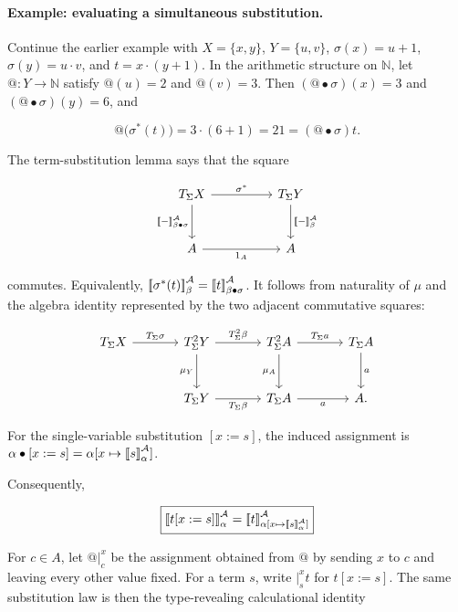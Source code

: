 \documentclass[11pt]{article}
\makeatletter
\newcommand{\llbracket}{\mathopen{[\mkern-3mu[}}
\newcommand{\rrbracket}{\mathclose{]\mkern-3mu]}}
\newcommand{\atsign}{\mathord{@}}
\makeatother
\begin{document}
\paragraph{Example: evaluating a simultaneous substitution.}
Continue the earlier example with \(X=\{x,y\}\), \(Y=\{u,v\}\),
\(\sigma(x)=u+1\), \(\sigma(y)=u\cdot v\), and
\(t=x\cdot(y+1)\). In the arithmetic structure on \(\mathbb N\), let
\(\atsign:Y\to\mathbb N\) satisfy \(\atsign(u)=2\) and \(\atsign(v)=3\).
Then \((\atsign\bullet\sigma)(x)=3\) and
\((\atsign\bullet\sigma)(y)=6\), and

\[
\atsign\bigl(\sigma^*(t)\bigr)
=3\cdot(6+1)=21
= (\atsign\bullet\sigma)t.
\]

The term-substitution lemma says
that the square

\[
\begin{tikzcd}[row sep=large,column sep=huge]
T_\Sigma X
  \arrow[r,"\sigma^*"]
  \arrow[d,"\llbracket-\rrbracket^{\mathcal A}_{\beta\bullet\sigma}"'] &
T_\Sigma Y
  \arrow[d,"\llbracket-\rrbracket^{\mathcal A}_{\beta}"] \\
A \arrow[r,"1_A"'] & A
\end{tikzcd}
\]

commutes. Equivalently,
\(\llbracket\sigma^*(t)\rrbracket^{\mathcal A}_\beta=
\llbracket t\rrbracket^{\mathcal A}_{\beta\bullet\sigma}\).
It follows from naturality of \(\mu\) and the algebra identity represented by
the two adjacent commutative squares:

\[
\begin{tikzcd}[row sep=large,column sep=large]
T_\Sigma X \arrow[r,"T_\Sigma\sigma"] &
T_\Sigma^2Y
  \arrow[r,"T_\Sigma^2\beta"]
  \arrow[d,"\mu_Y"'] &
T_\Sigma^2A
  \arrow[r,"T_\Sigma a"]
  \arrow[d,"\mu_A"'] &
T_\Sigma A \arrow[d,"a"] \\
& T_\Sigma Y
  \arrow[r,"T_\Sigma\beta"'] &
T_\Sigma A \arrow[r,"a"'] & A.
\end{tikzcd}
\]

For the single-variable substitution \([x:=s]\), the induced assignment is
\(\alpha\bullet[x:=s]=
\alpha[x\mapsto\llbracket s\rrbracket^{\mathcal A}_\alpha]\).

Consequently,

\[
\boxed{
\llbracket t[x:=s]\rrbracket^{\mathcal A}_\alpha
=
\llbracket t\rrbracket^{\mathcal A}_{
\alpha[x\mapsto\llbracket s\rrbracket^{\mathcal A}_\alpha]}
}
\]

For \(c\in A\), let \(\atsign\vert_c^x\) be the assignment obtained from
\(\atsign\) by sending \(x\) to \(c\) and leaving every other value fixed.
For a term \(s\), write \(\vert_s^x t\) for \(t[x:=s]\). The same substitution law is then the
type-revealing calculational identity
\end{document}

